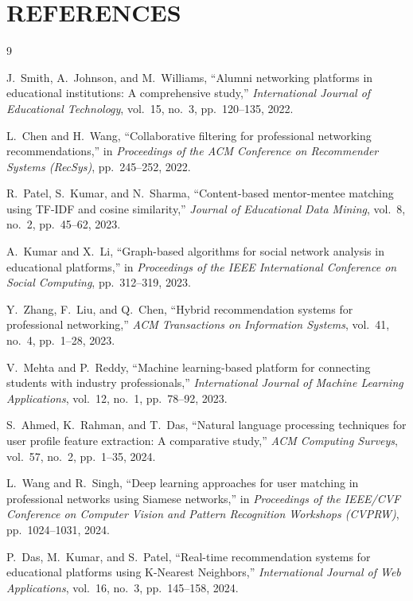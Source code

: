 \documentclass[12pt,a4paper]{report}
\begin{document}

\clearpage
\chapter{REFERENCES}
\thispagestyle{plain}
\begin{thebibliography}{9}

J.~Smith, A.~Johnson, and M.~Williams, ``Alumni networking platforms in educational institutions: A comprehensive study,'' \emph{International Journal of Educational Technology}, vol.~15, no.~3, pp.~120--135, 2022.

L.~Chen and H.~Wang, ``Collaborative filtering for professional networking recommendations,'' in \emph{Proceedings of the ACM Conference on Recommender Systems (RecSys)}, pp.~245--252, 2022.

R.~Patel, S.~Kumar, and N.~Sharma, ``Content-based mentor-mentee matching using TF-IDF and cosine similarity,'' \emph{Journal of Educational Data Mining}, vol.~8, no.~2, pp.~45--62, 2023.

A.~Kumar and X.~Li, ``Graph-based algorithms for social network analysis in educational platforms,'' in \emph{Proceedings of the IEEE International Conference on Social Computing}, pp.~312--319, 2023.

Y.~Zhang, F.~Liu, and Q.~Chen, ``Hybrid recommendation systems for professional networking,'' \emph{ACM Transactions on Information Systems}, vol.~41, no.~4, pp.~1--28, 2023.

V.~Mehta and P.~Reddy, ``Machine learning-based platform for connecting students with industry professionals,'' \emph{International Journal of Machine Learning Applications}, vol.~12, no.~1, pp.~78--92, 2023.

S.~Ahmed, K.~Rahman, and T.~Das, ``Natural language processing techniques for user profile feature extraction: A comparative study,'' \emph{ACM Computing Surveys}, vol.~57, no.~2, pp.~1--35, 2024.

L.~Wang and R.~Singh, ``Deep learning approaches for user matching in professional networks using Siamese networks,'' in \emph{Proceedings of the IEEE/CVF Conference on Computer Vision and Pattern Recognition Workshops (CVPRW)}, pp.~1024--1031, 2024.

P.~Das, M.~Kumar, and S.~Patel, ``Real-time recommendation systems for educational platforms using K-Nearest Neighbors,'' \emph{International Journal of Web Applications}, vol.~16, no.~3, pp.~145--158, 2024.

\end{thebibliography}
\end{document}
